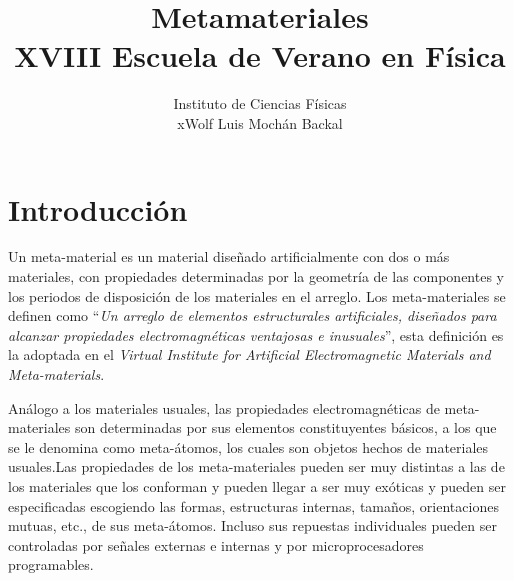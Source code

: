 \documentclass[12pt]{article}
\title{Metamateriales \\
  XVIII Escuela de Verano en Física}
\author{ Instituto de Ciencias Físicas \\
      x\small Wolf Luis Mochán Backal }
\date{}
\begin{document}
\maketitle 
\tableofcontents

\section{Introducción}


Un meta-material es un material diseñado artificialmente con dos o más
materiales, con propiedades determinadas por la geometría de las
componentes y los periodos de disposición de los materiales en el
arreglo. Los meta-materiales se definen como ``{\em Un arreglo de
  elementos estructurales artificiales, diseñados para alcanzar
  propiedades electromagnéticas ventajosas e
  inusuales}''\cite{Metamorphose}, esta definición es la adoptada en
el {\em Virtual Institute for Artificial Electromagnetic Materials and
  Meta-materials}.

Análogo a los materiales usuales, las propiedades electromagnéticas de
meta-materiales son determinadas por sus elementos constituyentes
básicos, a los que se le denomina como meta-átomos, los cuales son
objetos hechos de materiales usuales.Las propiedades de los
meta-materiales pueden ser muy distintas a las de los materiales que
los conforman y pueden llegar a ser muy exóticas y pueden ser
especificadas escogiendo las formas, estructuras internas, tamaños,
orientaciones mutuas, etc., de sus meta-átomos.  Incluso sus repuestas
individuales pueden ser controladas por señales externas e internas y
por microprocesadores
programables.\cite{IntroductiontoMetamaterialsandNanophotonics}
\end{document}
